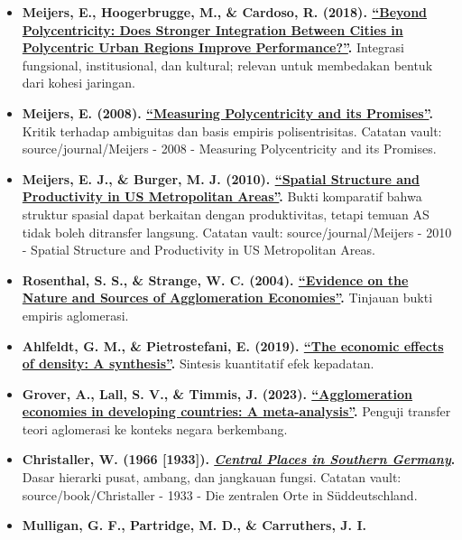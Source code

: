 \documentclass[
  indonesian,
  11pt,
  a4paper,
  oneside,
  openany]{report}
\begin{document}
\begin{itemize}
  sistem perkotaan Korea yang hierarkis; relevan sebagai penguji
  transfer dari konteks Eropa, bukan sebagai dasar klasik.
\item
  \textbf{Meijers, E., Hoogerbrugge, M., \& Cardoso, R. (2018).
  \href{https://doi.org/10.1111/tesg.12292}{``Beyond Polycentricity:
  Does Stronger Integration Between Cities in Polycentric Urban Regions
  Improve Performance?''}.} Integrasi fungsional, institusional, dan
  kultural; relevan untuk membedakan bentuk dari kohesi jaringan.
\item
  \textbf{Meijers, E. (2008).
  \href{https://doi.org/10.1080/09654310802401805}{``Measuring
  Polycentricity and its Promises''}.} Kritik terhadap ambiguitas dan
  basis empiris polisentrisitas. Catatan vault: source/journal/Meijers -
  2008 - Measuring Polycentricity and its Promises.
\item
  \textbf{Meijers, E. J., \& Burger, M. J. (2010).
  \href{https://doi.org/10.1068/a42151}{``Spatial Structure and
  Productivity in US Metropolitan Areas''}.} Bukti komparatif bahwa
  struktur spasial dapat berkaitan dengan produktivitas, tetapi temuan
  AS tidak boleh ditransfer langsung. Catatan vault:
  source/journal/Meijers - 2010 - Spatial Structure and Productivity in
  US Metropolitan Areas.
\item
  \textbf{Rosenthal, S. S., \& Strange, W. C. (2004).
  \href{https://doi.org/10.1016/S1574-0080(04)80006-3}{``Evidence on the
  Nature and Sources of Agglomeration Economies''}.} Tinjauan bukti
  empiris aglomerasi.
\item
  \textbf{Ahlfeldt, G. M., \& Pietrostefani, E. (2019).
  \href{https://doi.org/10.1016/j.jue.2019.04.006}{``The economic
  effects of density: A synthesis''}.} Sintesis kuantitatif efek
  kepadatan.
\item
  \textbf{Grover, A., Lall, S. V., \& Timmis, J. (2023).
  \href{https://doi.org/10.1016/j.regsciurbeco.2023.103901}{``Agglomeration
  economies in developing countries: A meta-analysis''}.} Penguji
  transfer teori aglomerasi ke konteks negara berkembang.
\item
  \textbf{Christaller, W. (1966 {[}1933{]}).
  \href{https://books.google.com/books/about/Central_places_in_southern_Germany.html?id=BONEAAAAIAAJ}{\emph{Central
  Places in Southern Germany}}.} Dasar hierarki pusat, ambang, dan
  jangkauan fungsi. Catatan vault: source/book/Christaller - 1933 - Die
  zentralen Orte in Süddeutschland.
\item
  \textbf{Mulligan, G. F., Partridge, M. D., \& Carruthers, J. I.
}
\end{itemize}
\end{document}
